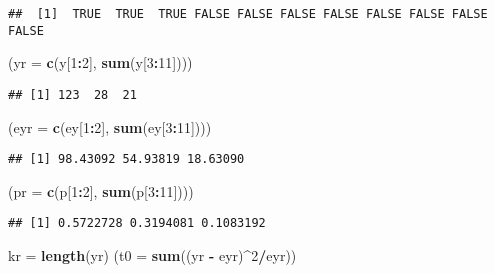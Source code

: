 \documentclass[
]{article}
\newenvironment{Shaded}{\begin{snugshade}}{\end{snugshade}}
\newcommand{\DataTypeTok}[1]{\textcolor[rgb]{0.13,0.29,0.53}{#1}}
\newcommand{\DecValTok}[1]{\textcolor[rgb]{0.00,0.00,0.81}{#1}}
\newcommand{\KeywordTok}[1]{\textcolor[rgb]{0.13,0.29,0.53}{\textbf{#1}}}
\newcommand{\NormalTok}[1]{#1}
\newcommand{\OperatorTok}[1]{\textcolor[rgb]{0.81,0.36,0.00}{\textbf{#1}}}
\newcommand{\StringTok}[1]{\textcolor[rgb]{0.31,0.60,0.02}{#1}}
\begin{document}
\begin{verbatim}
##  [1]  TRUE  TRUE  TRUE FALSE FALSE FALSE FALSE FALSE FALSE FALSE FALSE
\end{verbatim}

\begin{Shaded}
\begin{Highlighting}[]
\NormalTok{(}\DataTypeTok{yr =} \KeywordTok{c}\NormalTok{(y[}\DecValTok{1}\OperatorTok{:}\DecValTok{2}\NormalTok{], }\KeywordTok{sum}\NormalTok{(y[}\DecValTok{3}\OperatorTok{:}\DecValTok{11}\NormalTok{])))}
\end{Highlighting}
\end{Shaded}

\begin{verbatim}
## [1] 123  28  21
\end{verbatim}

\begin{Shaded}
\begin{Highlighting}[]
\NormalTok{(}\DataTypeTok{eyr =} \KeywordTok{c}\NormalTok{(ey[}\DecValTok{1}\OperatorTok{:}\DecValTok{2}\NormalTok{], }\KeywordTok{sum}\NormalTok{(ey[}\DecValTok{3}\OperatorTok{:}\DecValTok{11}\NormalTok{])))}
\end{Highlighting}
\end{Shaded}

\begin{verbatim}
## [1] 98.43092 54.93819 18.63090
\end{verbatim}

\begin{Shaded}
\begin{Highlighting}[]
\NormalTok{(}\DataTypeTok{pr =} \KeywordTok{c}\NormalTok{(p[}\DecValTok{1}\OperatorTok{:}\DecValTok{2}\NormalTok{], }\KeywordTok{sum}\NormalTok{(p[}\DecValTok{3}\OperatorTok{:}\DecValTok{11}\NormalTok{])))}
\end{Highlighting}
\end{Shaded}

\begin{verbatim}
## [1] 0.5722728 0.3194081 0.1083192
\end{verbatim}

\begin{Shaded}
\begin{Highlighting}[]
\NormalTok{kr =}\StringTok{ }\KeywordTok{length}\NormalTok{(yr)}
\NormalTok{(}\DataTypeTok{t0 =} \KeywordTok{sum}\NormalTok{((yr }\OperatorTok{-}\StringTok{ }\NormalTok{eyr)}\OperatorTok{^}\DecValTok{2}\OperatorTok{/}\NormalTok{eyr))}
\end{Highlighting}
\end{Shaded}
\end{document}
